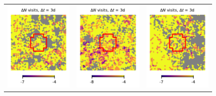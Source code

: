 \documentclass[preprintm,linenumbers]{aastex631}
\begin{document}
\begin{figure}
\begin{tabular}{  c c c}
				\includegraphics{results/skymaps_cutout/skymaps_cutout_delta_first_year_one_snap_v4_0_10yrs_db_noDD_noTwi_tscale-3_nside-256_doAllTemplateMetrics_reduceCount_g_NES_noDD_noTwi.pdf} &
				\includegraphics{results/skymaps_cutout/skymaps_cutout_delta_first_year_one_snap_v4_0_10yrs_db_noDD_noTwi_tscale-3_nside-256_doAllTemplateMetrics_reduceCount_g_WFD_noDD_noTwi.pdf} &
				\includegraphics{results/skymaps_cutout/skymaps_cutout_delta_first_year_one_snap_v4_0_10yrs_db_noDD_noTwi_tscale-3_nside-256_doAllTemplateMetrics_reduceCount_g_GP_noDD_noTwi.pdf} \\

\end{tabular}
\end{figure}
\end{document}
